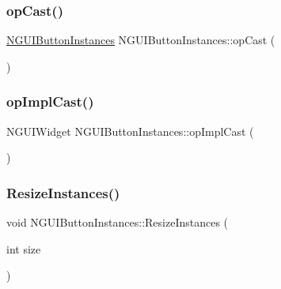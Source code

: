 \hypertarget{class_n_g_u_i_button_instances_a4fb1c8a70df1262214cb049f7f874347}{}\label{class_n_g_u_i_button_instances_a4fb1c8a70df1262214cb049f7f874347} 
\subsubsection{\texorpdfstring{op\+Cast()}{opCast()}}
{\footnotesize\ttfamily \hyperlink{class_n_g_u_i_button_instances}{N\+G\+U\+I\+Button\+Instances} N\+G\+U\+I\+Button\+Instances\+::op\+Cast (\begin{DoxyParamCaption}{ }\end{DoxyParamCaption})}

\hypertarget{class_n_g_u_i_button_instances_aa516ba0f40b6f53c222bffbb96728658}{}\label{class_n_g_u_i_button_instances_aa516ba0f40b6f53c222bffbb96728658} 
\subsubsection{\texorpdfstring{op\+Impl\+Cast()}{opImplCast()}}
{\footnotesize\ttfamily N\+G\+U\+I\+Widget N\+G\+U\+I\+Button\+Instances\+::op\+Impl\+Cast (\begin{DoxyParamCaption}{ }\end{DoxyParamCaption})}

\hypertarget{class_n_g_u_i_button_instances_a97f3b0512ba13b8d68544fa0a9985d0f}{}\label{class_n_g_u_i_button_instances_a97f3b0512ba13b8d68544fa0a9985d0f} 
\subsubsection{\texorpdfstring{Resize\+Instances()}{ResizeInstances()}}
{\footnotesize\ttfamily void N\+G\+U\+I\+Button\+Instances\+::\+Resize\+Instances (\begin{DoxyParamCaption}\item[{int}]{size }\end{DoxyParamCaption})}

